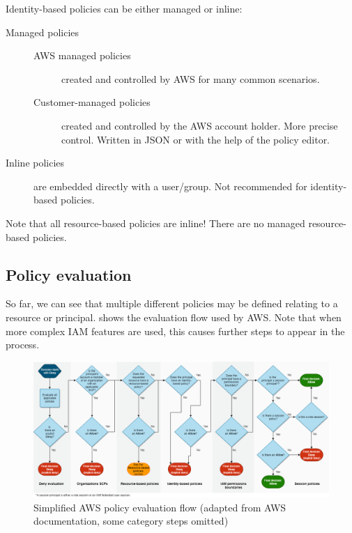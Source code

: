 Identity-based policies can be either managed or inline:

\begin{description}
\item[Managed policies]
\begin{description}
\item[AWS managed policies]
created and controlled by AWS for many common scenarios.
\item[Customer-managed policies]
created and controlled by the AWS account holder. More precise control.
Written in JSON or with the help of the policy editor.
\end{description}
\item[Inline policies]
are embedded directly with a user/group. Not recommended for
identity-based policies.
\end{description}

Note that all resource-based policies are inline! There are no managed
resource-based policies.

\subsection{Policy evaluation}\label{policy-evaluation}

So far, we can see that multiple different policies may be defined
relating to a resource or principal. shows the evaluation flow used by
AWS. Note that when more complex IAM features are used, this causes
further steps to appear in the process.

\begin{figure}
\centering
\includegraphics{iam_policy_evaluation}
\caption{Simplified AWS policy evaluation flow (adapted from AWS
documentation, some category steps omitted){}}
\end{figure}
